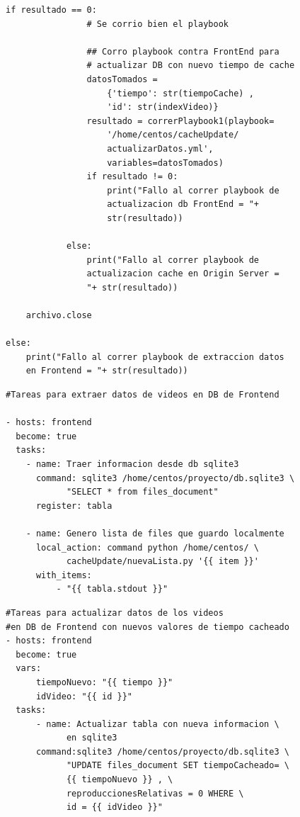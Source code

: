 \documentclass[12pt,a4paper,oneside]{book}
\begin{document}
\begin{lstlisting}[style=codigobase,  label = cod_autoCache, caption= actualizacionAutoCache.py]
            if resultado == 0:
                # Se corrio bien el playbook

                ## Corro playbook contra FrontEnd para 
                # actualizar DB con nuevo tiempo de cache
                datosTomados = 
                    {'tiempo': str(tiempoCache) ,
                    'id': str(indexVideo)}
                resultado = correrPlaybook1(playbook=
                    '/home/centos/cacheUpdate/
                    actualizarDatos.yml',
                    variables=datosTomados)
                if resultado != 0:
                    print("Fallo al correr playbook de
                    actualizacion db FrontEnd = "+
                    str(resultado))

            else:
                print("Fallo al correr playbook de
                actualizacion cache en Origin Server = 
                "+ str(resultado))

    archivo.close

else:
    print("Fallo al correr playbook de extraccion datos
    en Frontend = "+ str(resultado))

\end{lstlisting}

\vspace{0.5cm}

\begin{lstlisting}[style=codigobase,  label = cod_extraerDatos, caption= extraerDatos.yml]
#Tareas para extraer datos de videos en DB de Frontend

- hosts: frontend
  become: true
  tasks:
    - name: Traer informacion desde db sqlite3
      command: sqlite3 /home/centos/proyecto/db.sqlite3 \
            "SELECT * from files_document"
      register: tabla
 
    - name: Genero lista de files que guardo localmente
      local_action: command python /home/centos/ \ 
            cacheUpdate/nuevaLista.py '{{ item }}' 
      with_items:
          - "{{ tabla.stdout }}"
\end{lstlisting}

\vspace{0.5cm}

\begin{lstlisting}[style=codigobase,  label = cod_actualizarDatos, caption= actualizarDatos.yml]
#Tareas para actualizar datos de los videos 
#en DB de Frontend con nuevos valores de tiempo cacheado
- hosts: frontend
  become: true
  vars:
      tiempoNuevo: "{{ tiempo }}"
      idVideo: "{{ id }}"
  tasks:
      - name: Actualizar tabla con nueva informacion \
            en sqlite3
      command:sqlite3 /home/centos/proyecto/db.sqlite3 \
            "UPDATE files_document SET tiempoCacheado= \
            {{ tiempoNuevo }} , \
            reproduccionesRelativas = 0 WHERE \
            id = {{ idVideo }}"
\end{lstlisting}
\end{document}
